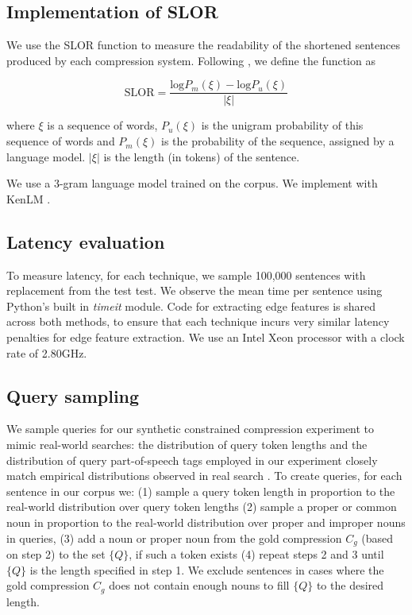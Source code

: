 \subsection{Implementation of SLOR}

We use the SLOR function to measure the readability of the shortened sentences produced by each compression system. Following \cite{lau2015unsupervised}, we define the function as 

\begin{equation}
\text{SLOR}=\frac{\text{log}P_m(\xi) - \text{log}P_u(\xi)}{|\xi|}
\end{equation}

where $\xi$ is a sequence of words, $P_u(\xi)$ is the unigram probability of this sequence of words and $P_m(\xi)$ is the probability of the sequence, assigned by a language model.  $|\xi|$ is the length (in tokens) of the sentence.

We use a 3-gram language model trained on the \citet{filippova2013overcoming} corpus. We implement with KenLM \cite{Heafield-kenlm}.

\subsection{Latency evaluation}
To measure latency, for each technique, we sample 100,000 sentences with replacement from the test test. We observe the mean time per sentence using Python's built in \textit{timeit} module. Code for extracting edge features is shared across both methods, to ensure that each technique incurs very similar latency penalties for edge feature extraction. We use an Intel Xeon processor with a clock rate of 2.80GHz. 

\subsection{Query sampling}
We sample queries for our synthetic constrained compression experiment to mimic real-world searches: the distribution of query token lengths and the distribution of query part-of-speech tags employed in our experiment closely match empirical distributions observed in real search \cite{Jansen2000RealLR,Barr2008TheLS}. To create queries, for each sentence in our corpus we: (1) sample a query token length in proportion to the real-world distribution over query token lengths (2) sample a proper or common noun in proportion to the real-world distribution over proper and improper nouns in queries, (3) add a noun or proper noun from the gold compression $C_g$ (based on step 2) to the set $\{Q\}$, if such a token exists (4) repeat steps 2 and 3 until $\{Q\}$ is the length specified in step 1. We exclude sentences in cases where the gold compression $C_g$ does not contain enough nouns to fill $\{Q\}$ to the desired length.

